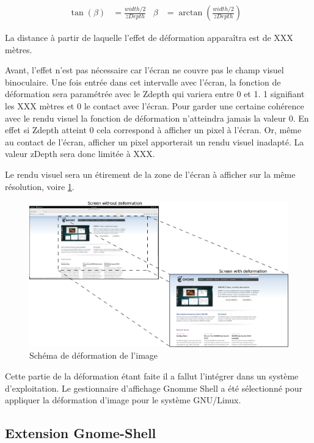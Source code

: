 \begin{align*}
  \tan(\beta)&=\frac{width/2}{zDepth}&
  \beta&=\arctan(\frac{width/2}{zDepth})&
\end{align*}

La distance à partir de laquelle l'effet de déformation apparaîtra est de  XXX mètres.

Avant, l'effet n'est pas nécessaire car l'écran ne couvre pas le champ visuel binoculaire. Une fois entrée dans cet intervalle avec l'écran, la fonction de déformation sera paramétrée avec le Zdepth qui variera entre 0 et 1. 1 signifiant les XXX mètres et 0 le contact avec l'écran. Pour garder une certaine cohérence avec le rendu visuel la fonction de déformation n'atteindra jamais la valeur 0. En effet si Zdepth atteint 0 cela correspond à afficher un pixel à l'écran. Or, même au contact de l'écran, afficher un pixel apporterait un rendu visuel inadapté. La valeur zDepth sera donc limitée à XXX.

Le rendu visuel sera un étirement de la zone de l'écran à afficher sur la même résolution, voire \ref{fig:deformationImage}.

\begin{figure}[h!]
	\center	
	\includegraphics[scale=0.25]{image/deformationImage.png}
	\caption{Schéma de déformation de l'image}
	\label{fig:deformationImage}
\end{figure}

Cette partie de la déformation étant faite il a fallut l'intégrer dans un système d'exploitation. Le gestionnaire d'affichage Gnomme Shell a été sélectionné pour appliquer la déformation d'image pour le système GNU/Linux.


\subsection{Extension Gnome-Shell}

